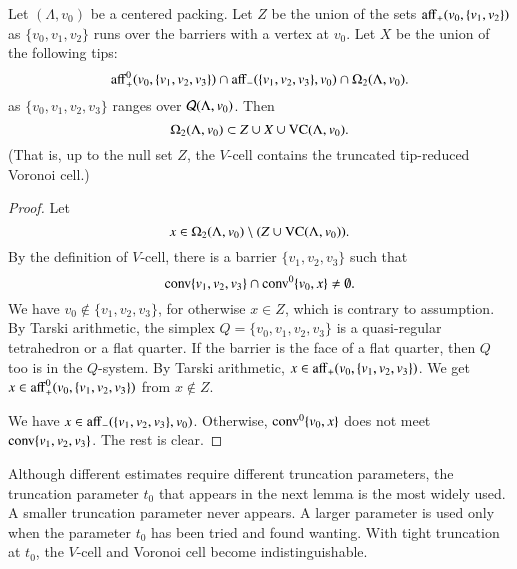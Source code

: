\begin{lemma} 
Let $(\Lambda,v_0)$ be a centered packing.  Let $Z$ be the union
of the sets ${\operatorname{aff}}_+(v_0,\{v_1,v_2\})$ as $\{v_0,v_1,v_2\}$
runs over the barriers with a vertex at $v_0$.  Let $X$ be the
union of the following tips:
   $$
   {\operatorname{aff}}_+^0(v_0,\{v_1,v_2,v_3\}) \cap {\operatorname{aff}}_-
   (\{v_1,v_2,v_3\},v_0)\cap \Omega_2(\Lambda,v_0).
   $$
as $\{v_0,v_1,v_2,v_3\}$ ranges over ${\mathcal Q}(\Lambda,v_0)$.
Then 
$$\Omega_2(\Lambda,v_0)
 \subset Z\cup X\cup {\operatorname{VC}}(\Lambda,v_0).$$
(That is, up to the null set $Z$, the $V$-cell contains
the truncated tip-reduced Voronoi cell.)
\end{lemma}

\begin{proof}  Let 
 $$x \in \Omega_2(\Lambda,v_0)
 \setminus (Z\cup{\operatorname{VC}}(\Lambda,v_0)).
 $$
By
the definition of $V$-cell, there is a barrier $\{v_1,v_2,v_3\}$
such that
  $${\operatorname{conv}}\{v_1,v_2,v_3\}\cap {\operatorname{conv}}^0\{v_0,x\}\ne\emptyset.$$ 
We have $v_0\not\in\{v_1,v_2,v_3\}$, for otherwise $x\in Z$, 
which is contrary to assumption. 
By Tarski arithmetic,
the simplex $Q=\{v_0,v_1,v_2,v_3\}$ is a quasi-regular tetrahedron
or a flat quarter.  If the barrier is the face of a flat quarter,
then $Q$ too is in
the $Q$-system.  By Tarski arithmetic,  $x\in{\operatorname{aff}}_+(v_0,\{v_1,v_2,v_3\})$.  
We get $x\in{\operatorname{aff}}_+^0(v_0,\{v_1,v_2,v_3\})$ from $x\not\in Z$.

We have $x\in{\operatorname{aff}}_-
   (\{v_1,v_2,v_3\},v_0)$. Otherwise, ${\operatorname{conv}}^0\{v_0,x\}$ does
not meet ${\operatorname{conv}}\{v_1,v_2,v_3\}$.
The rest is clear.
\end{proof}

Although different estimates require different
truncation parameters, the truncation parameter $t_0$ that appears in
the next lemma is the most widely used.  A smaller truncation parameter never
appears.  A larger parameter is used only when the parameter $t_0$
has been tried and found wanting.  With tight truncation at $t_0$,
 the $V$-cell and Voronoi cell become
indistinguishable.

